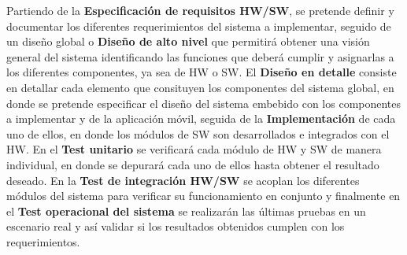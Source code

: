 Partiendo de la \textbf{Especificación de requisitos HW/SW}, se pretende definir y documentar los diferentes requerimientos del sistema a implementar, seguido de un diseño global o \textbf{Diseño de alto nivel} que permitirá obtener una visión general del sistema identificando las funciones que deberá cumplir y asignarlas a los diferentes componentes, ya sea de HW o SW. El \textbf{Diseño en detalle} consiste en detallar cada elemento que consituyen los componentes del sistema global, en donde se pretende especificar el diseño del sistema embebido con los componentes a implementar y de la aplicación móvil, seguida de la \textbf{Implementación} de cada uno de ellos, en donde los módulos de SW son desarrollados e integrados con el HW. En el \textbf{Test unitario} se verificará cada módulo de HW y SW de manera individual, en donde se depurará cada uno de ellos hasta obtener el resultado deseado. En la \textbf{Test de integración HW/SW} se acoplan los diferentes módulos del sistema para verificar su funcionamiento en conjunto y finalmente en el \textbf{Test operacional del sistema} se realizarán las últimas pruebas en un escenario real y así validar si los resultados obtenidos cumplen con los requerimientos. \\